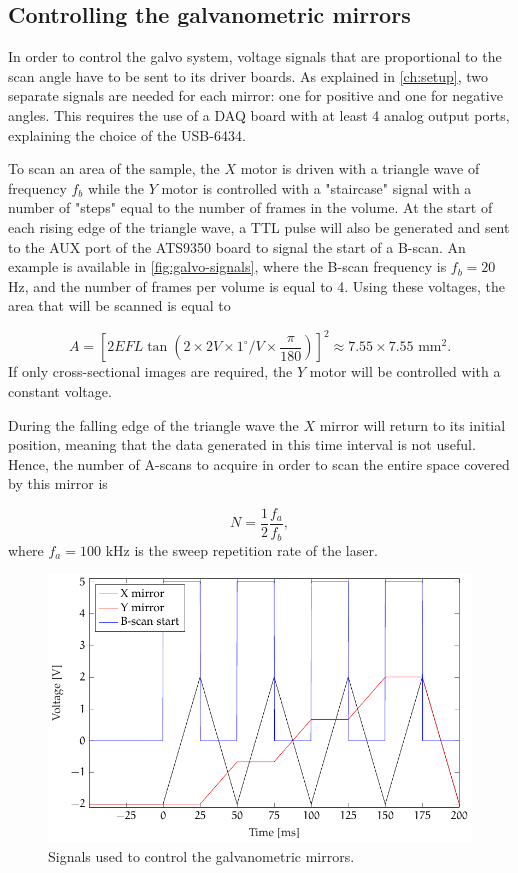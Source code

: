 \subsection{Controlling the galvanometric mirrors}
In order to control the galvo system, voltage signals that are proportional to the scan angle have to be sent to its driver boards. As explained in \autoref{ch:setup}, two separate signals are needed for each mirror: one for positive and one for negative angles. This requires the use of a \ac{DAQ} board with at least 4 analog output ports, explaining the choice of the USB-6434. 

To scan an area of the sample, the $X$ motor is driven with a triangle wave of frequency $f_b$ while the $Y$ motor is controlled with a "staircase" signal with a number of "steps" equal to the number of frames in the volume. At the start of each rising edge of the triangle wave, a TTL pulse will also be generated and sent to the AUX port of the ATS9350 board to signal the start of a B-scan. An example is available in \autoref{fig:galvo-signals}, where the B-scan frequency is $f_b = 20$ Hz, and the number of frames per volume is equal to 4. Using these voltages, the area that will be scanned is equal to 

\begin{equation}
	A = \left[2 EFL \tan\left( 2 \times 2 V \times 1  ^ \circ/V \times \frac{\pi}{180}\right)\right]^2 \approx 7.55\times 7.55 \text{ mm}^2.
\end{equation}
If only cross-sectional images are required, the $Y$ motor will be controlled with a constant voltage. 

During the falling edge of the triangle wave the $X$ mirror will return to its initial position, meaning that the data generated in this time interval is not useful. Hence, the number of A-scans to acquire in order to scan the entire space covered by this mirror is

\begin{equation}\label{eq:bscan-maxwidth}
	N = \frac{1}{2} \frac{f_a}{f_b},
\end{equation}
where $f_a = 100$ kHz is the sweep repetition rate of the laser. 

\begin{figure}[htb]
	\myfloatalign
	\includegraphics[width=0.9\linewidth]{gfx/ch4/galvo-signals}
	\caption{Signals used to control the galvanometric mirrors.}\label{fig:galvo-signals}
\end{figure}

